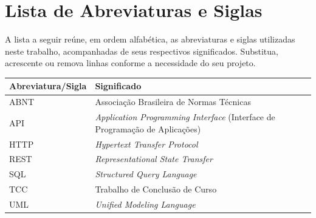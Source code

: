 \documentclass[
    12pt,                %
    openright,           %
    oneside,             %
    a4paper,             %
    english,             %
    brazil               %
]{abntex2}
\begin{document}
\chapter*{Lista de Abreviaturas e Siglas}

\noindent A lista a seguir reúne, em ordem alfabética, as abreviaturas e siglas utilizadas neste trabalho, acompanhadas de seus respectivos significados. Substitua, acrescente ou remova linhas conforme a necessidade do seu projeto.

\vspace{\onelineskip}

\begin{center}
\begin{tabular}{@{}p{3.2cm}p{}@{}}
\toprule
\textbf{Abreviatura/Sigla} & \textbf{Significado} \\
\midrule
ABNT  & Associação Brasileira de Normas Técnicas \\
API   & \textit{Application Programming Interface} (Interface de Programação de Aplicações) \\
HTTP  & \textit{Hypertext Transfer Protocol} \\
REST  & \textit{Representational State Transfer} \\
SQL   & \textit{Structured Query Language} \\
TCC   & Trabalho de Conclusão de Curso \\
UML   & \textit{Unified Modeling Language} \\
\bottomrule
\end{tabular}
\end{center}

\cleardoublepage

\tableofcontents*
\cleardoublepage

\textual
\end{document}
